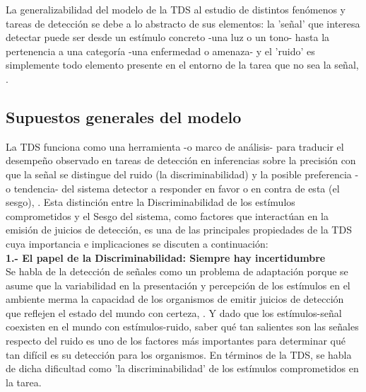 La generalizabilidad del modelo de la TDS al estudio de distintos fenómenos y tareas de detección se debe a lo abstracto de sus elementos: la 'señal' que interesa detectar puede ser desde un estímulo concreto -una luz o un tono- hasta la pertenencia a una categoría -una enfermedad o amenaza- y el 'ruido' es simplemente todo elemento presente en el entorno de la tarea que no sea la señal, \parencite{Stainslaw1999, McNicol1}.\\ 

\subsection{Supuestos generales del modelo}

La TDS funciona como una herramienta -o marco de análisis- para traducir el desempeño observado en tareas de detección en inferencias sobre la precisión con que la señal se distingue del ruido (la discriminabilidad) y la posible preferencia -o tendencia- del sistema detector a responder en favor o en contra de esta (el sesgo), \parencite{McNicol1}. Esta distinción entre la Discriminabilidad de los estímulos comprometidos y el Sesgo del sistema, como factores que interactúan en la emisión de juicios de detección, es una de las principales propiedades de la TDS \parencite{Swets1961} cuya importancia e implicaciones se discuten a continuación:\\

\textbf{1.- El papel de la Discriminabilidad: Siempre hay incertidumbre}\\

Se habla de la detección de señales como un problema de adaptación porque se asume que la variabilidad en la presentación y percepción de los estímulos en el ambiente merma la capacidad de los organismos de emitir juicios de detección que reflejen el estado del mundo con certeza, \parencite{Tanner1954}. Y dado que los estímulos-señal coexisten en el mundo con estímulos-ruido, saber qué tan salientes son las señales respecto del ruido es uno de los factores más importantes para determinar qué tan difícil es su detección para los organismos. En términos de la TDS, se habla de dicha dificultad como 'la discriminabilidad' de los estímulos comprometidos en la tarea.\\


